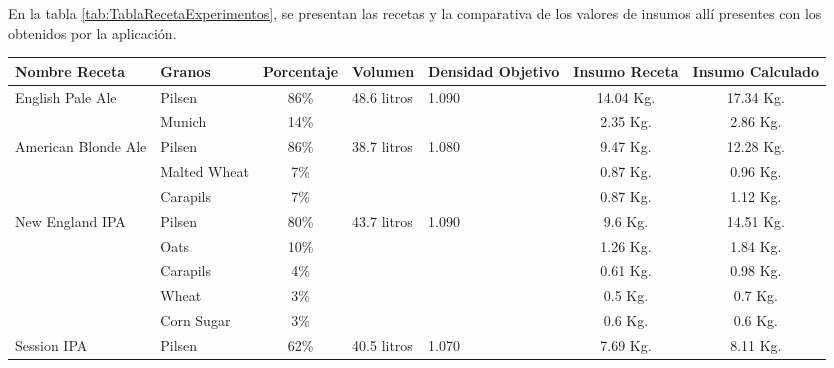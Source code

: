 En la tabla \ref{tab:TablaRecetaExperimentos}, se presentan las recetas y la comparativa de los valores de insumos allí presentes con los obtenidos por la aplicación.
\begin{table}[H]
    \centering
    \begin{tabularx}{\textwidth}{|X|X|X|X|X|X|X|}
    \hline
        Nombre Receta & Granos & Porcentaje & Volumen & Densidad Objetivo & Insumo Receta & Insumo Calculado \\
        \hline
        \hline
        \multirow{2}{2cm}{English Pale Ale} & Pilsen &\multicolumn{1}{c|}{86\%}  &\multirow{2}{2cm}{48.6 litros}  &\multirow{2}{2cm}{1.090} & \multicolumn{1}{c|}{14.04 Kg.} & \multicolumn{1}{c|}{17.34 Kg.}\\
         & Munich & \multicolumn{1}{c|}{14\%} & & &\multicolumn{1}{c|}{2.35 Kg.} &\multicolumn{1}{c|}{2.86 Kg.} \\
        \hline
        \multirow{3}{2cm}{American Blonde Ale} & Pilsen &\multicolumn{1}{c|}{86\%}  &\multirow{3}{2cm}{38.7 litros}  &\multirow{3}{2cm}{1.080} & \multicolumn{1}{c|}{9.47 Kg.} & \multicolumn{1}{c|}{12.28 Kg.}\\
         & Malted Wheat & \multicolumn{1}{c|}{7\%} & & &\multicolumn{1}{c|}{0.87 Kg.} &\multicolumn{1}{c|}{0.96 Kg.}\\ 
         & Carapils & \multicolumn{1}{c|}{7\%} & & & \multicolumn{1}{c|}{0.87 Kg.} &\multicolumn{1}{c|}{1.12 Kg.} \\
        \hline
        \multirow{5}{2cm}{New England IPA} & Pilsen &\multicolumn{1}{c|}{80\%}  &\multirow{5}{2cm}{43.7 litros}  &\multirow{5}{2cm}{1.090} & \multicolumn{1}{c|}{9.6 Kg.} & \multicolumn{1}{c|}{14.51 Kg.}\\
         & Oats & \multicolumn{1}{c|}{10\%} & & &\multicolumn{1}{c|}{1.26 Kg.} &\multicolumn{1}{c|}{1.84 Kg.} \\
        & Carapils & \multicolumn{1}{c|}{4\%} & & &\multicolumn{1}{c|}{0.61 Kg.} &\multicolumn{1}{c|}{0.98 Kg.} \\
        & Wheat & \multicolumn{1}{c|}{3\%} & & &\multicolumn{1}{c|}{0.5 Kg.} &\multicolumn{1}{c|}{0.7 Kg.} \\
        & Corn Sugar & \multicolumn{1}{c|}{3\%} & & &\multicolumn{1}{c|}{0.6 Kg.} &\multicolumn{1}{c|}{0.6 Kg.} \\
        \hline
        \multirow{4}{2cm}{Session IPA} & Pilsen &\multicolumn{1}{c|}{62\%}  &\multirow{4}{2cm}{40.5 litros}  &\multirow{4}{2cm}{1.070} & \multicolumn{1}{c|}{7.69 Kg.} & \multicolumn{1}{c|}{8.11 Kg.}\\

\end{tabularx}
\end{table}
